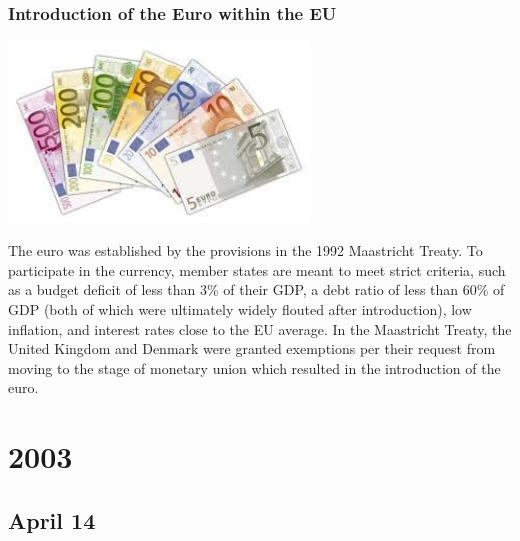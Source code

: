 \documentclass[11pt]{report}
\begin{document}
\subsection{Introduction of the Euro within the EU}
\vspace{2mm}\begin{center}\includegraphics[width=8cm]{./img/euro.jpg}\end{center}
The euro was established by the provisions in the 1992 Maastricht Treaty. To participate in the currency, member states are meant to meet strict criteria, such as a budget deficit of less than 3\% of their GDP, a debt ratio of less than 60\% of GDP (both of which were ultimately widely flouted after introduction), low inflation, and interest rates close to the EU average. In the Maastricht Treaty, the United Kingdom and Denmark were granted exemptions per their request from moving to the stage of monetary union which resulted in the introduction of the euro.

\chapter{2003}
\section{April 14}
\end{document}
